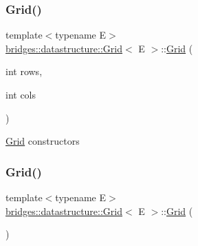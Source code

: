 \subsubsection{\texorpdfstring{Grid()}{Grid()}\hspace{0.1cm}{\footnotesize\ttfamily [1/4]}}
{\footnotesize\ttfamily template$<$typename E$>$ \\
\mbox{\hyperlink{classbridges_1_1datastructure_1_1_grid}{bridges\+::datastructure\+::\+Grid}}$<$ E $>$\+::\mbox{\hyperlink{classbridges_1_1datastructure_1_1_grid}{Grid}} (\begin{DoxyParamCaption}\item[{int}]{rows,  }\item[{int}]{cols }\end{DoxyParamCaption})\hspace{0.3cm}{\ttfamily [inline]}}

\mbox{\hyperlink{classbridges_1_1datastructure_1_1_grid}{Grid}} constructors \mbox{\label{classbridges_1_1datastructure_1_1_grid_a41c8c94cd9a22ccf978c5e2b1141c813}} 
\subsubsection{\texorpdfstring{Grid()}{Grid()}\hspace{0.1cm}{\footnotesize\ttfamily [2/4]}}
{\footnotesize\ttfamily template$<$typename E$>$ \\
\mbox{\hyperlink{classbridges_1_1datastructure_1_1_grid}{bridges\+::datastructure\+::\+Grid}}$<$ E $>$\+::\mbox{\hyperlink{classbridges_1_1datastructure_1_1_grid}{Grid}} (\begin{DoxyParamCaption}{ }\end{DoxyParamCaption})\hspace{0.3cm}{\ttfamily [inline]}}

\mbox{\label{classbridges_1_1datastructure_1_1_grid_ad47ddbed7bbd07f98aaa61b74fcf826c}} 
